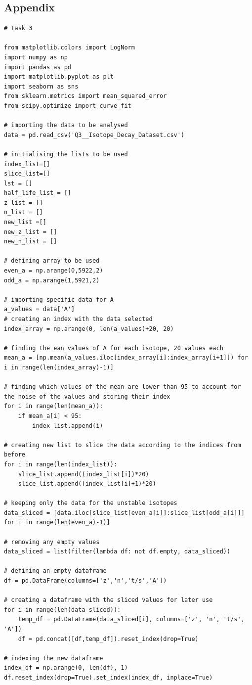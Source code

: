 \documentclass[12pt, a4paper]{article}
\begin{document}
\subsection{Appendix}
\begin{verbatim}
# Task 3

from matplotlib.colors import LogNorm
import numpy as np
import pandas as pd
import matplotlib.pyplot as plt
import seaborn as sns
from sklearn.metrics import mean_squared_error
from scipy.optimize import curve_fit

# importing the data to be analysed
data = pd.read_csv('Q3__Isotope_Decay_Dataset.csv')

# initialising the lists to be used
index_list=[]
slice_list=[]
lst = []
half_life_list = []
z_list = []
n_list = []
new_list =[]
new_z_list = []
new_n_list = []

# defining array to be used
even_a = np.arange(0,5922,2)
odd_a = np.arange(1,5921,2)

# importing specific data for A
a_values = data['A']
# creating an index with the data selected
index_array = np.arange(0, len(a_values)+20, 20)

# finding the ean values of A for each isotope, 20 values each
mean_a = [np.mean(a_values.iloc[index_array[i]:index_array[i+1]]) for i in range(len(index_array)-1)]

# finding which values of the mean are lower than 95 to account for the noise of the values and storing their index
for i in range(len(mean_a)):
    if mean_a[i] < 95:
        index_list.append(i)

# creating new list to slice the data according to the indices from before
for i in range(len(index_list)):
    slice_list.append((index_list[i])*20)
    slice_list.append((index_list[i]+1)*20)

# keeping only the data for the unstable isotopes
data_sliced = [data.iloc[slice_list[even_a[i]]:slice_list[odd_a[i]]] for i in range(len(even_a)-1)]

# removing any empty values
data_sliced = list(filter(lambda df: not df.empty, data_sliced))

# defining an empty dataframe
df = pd.DataFrame(columns=['z','n','t/s','A'])

# creating a dataframe with the sliced values for later use
for i in range(len(data_sliced)):
    temp_df = pd.DataFrame(data_sliced[i], columns=['z', 'n', 't/s', 'A'])
    df = pd.concat([df,temp_df]).reset_index(drop=True)

# indexing the new dataframe
index_df = np.arange(0, len(df), 1)
df.reset_index(drop=True).set_index(index_df, inplace=True)


\end{verbatim}
\end{document}
